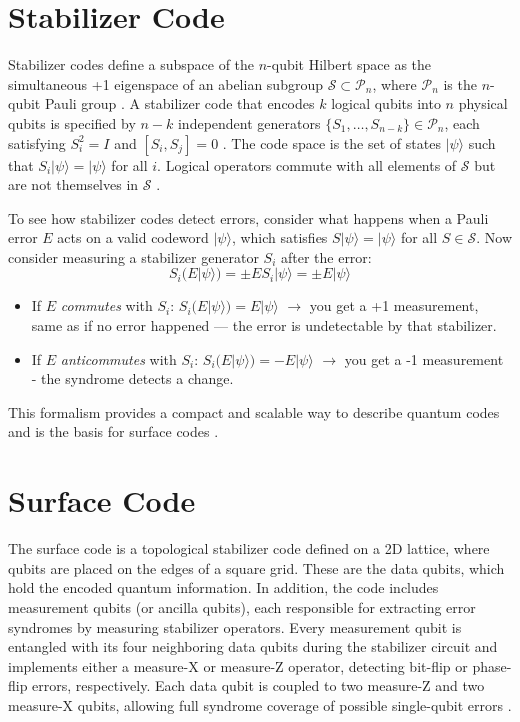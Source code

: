 \documentclass[9pt,a4paper,twocolumn,twoside]{tau-class/tau}
\begin{document}
\section{Stabilizer Code}
Stabilizer codes define a subspace of the $n$-qubit Hilbert space as the simultaneous +1 eigenspace of an abelian subgroup $\mathcal{S} \subset \mathcal{P}_n$, where $\mathcal{P}_n$ is the $n$-qubit Pauli group \cite{gottesman1997stabilizer}. A stabilizer code that encodes $k$ logical qubits into $n$ physical qubits is specified by $n - k$ independent generators $\{ S_1, \dots, S_{n-k} \} \in \mathcal{P}_n$, each satisfying $S_i^2 = I$ and $[S_i, S_j] = 0$ \cite{gottesman1997stabilizer}. The code space is the set of states $|\psi\rangle$ such that $S_i |\psi\rangle = |\psi\rangle$ for all $i$. Logical operators commute with all elements of $\mathcal{S}$ but are not themselves in $\mathcal{S}$ \cite{gottesman1997stabilizer}.

To see how stabilizer codes detect errors, consider what happens when a Pauli error $E$ acts on a valid codeword $|\psi\rangle$, which satisfies $S|\psi\rangle = |\psi\rangle$ for all $S \in \mathcal{S}$. Now consider measuring a stabilizer generator \( S_i \) after the error:
\begin{equation}
    S_i(E|\psi\rangle) = \pm E S_i |\psi\rangle = \pm E |\psi\rangle
    \label{eq: stabilizer}
\end{equation}
\begin{itemize}[left=0pt]
    \item If \( E \) \textit{commutes} with \( S_i \): \( S_i(E|\psi\rangle) = E|\psi\rangle \) $\rightarrow$ you get a +1 measurement, same as if no error happened — the error is undetectable by that stabilizer.
    \item If \( E \) \textit{anticommutes} with \( S_i \): \( S_i(E|\psi\rangle) = -E|\psi\rangle \) $\rightarrow$ you get a -1 measurement - the syndrome detects a change.
\end{itemize}
This formalism provides a compact and scalable way to describe quantum codes and is the basis for surface codes \cite{fowler2012surface}.

\section{Surface Code}
The surface code is a topological stabilizer code defined on a 2D lattice, where qubits are placed on the edges of a square grid. These are the data qubits, which hold the encoded quantum information. In addition, the code includes measurement qubits (or ancilla qubits), each responsible for extracting error syndromes by measuring stabilizer operators. Every measurement qubit is entangled with its four neighboring data qubits during the stabilizer circuit and implements either a measure-X or measure-Z operator, detecting bit-flip or phase-flip errors, respectively. Each data qubit is coupled to two measure-Z and two measure-X qubits, allowing full syndrome coverage of possible single-qubit errors \cite{fowler2012surface}.
\end{document}

